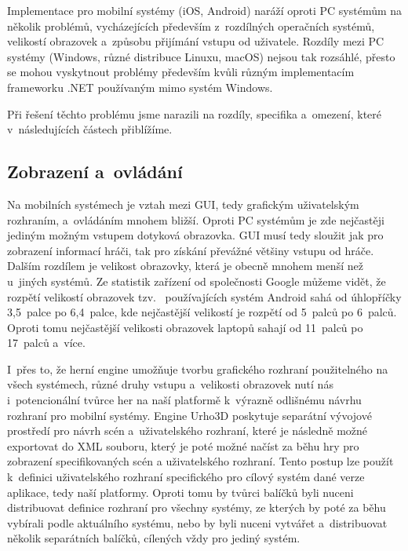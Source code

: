 Implementace pro mobilní systémy (iOS, Android) naráží oproti PC systémům na několik problémů, vycházejících především z~rozdílných operačních systémů, velikostí obrazovek a~způsobu přijímání vstupu od uživatele. Rozdíly mezi PC systémy (Windows, různé distribuce Linuxu, macOS) nejsou tak rozsáhlé, přesto se mohou vyskytnout problémy především kvůli různým implementacím frameworku .NET používaným mimo systém Windows.

Při řešení těchto problému jsme narazili na rozdíly, specifika a~omezení, které v~následujících částech přiblížíme.

\subsection{Zobrazení a~ovládání}
Na mobilních systémech je vztah mezi GUI, tedy grafickým uživatelským rozhraním, a~ovládáním mnohem bližší. Oproti PC systémům je zde nejčastěji jediným možným vstupem dotyková obrazovka. GUI musí tedy sloužit jak pro zobrazení informací hráči, tak pro získání převážné většiny vstupu od hráče. Dalším rozdílem je velikost obrazovky, která je obecně mnohem menší než u~jiných systémů. Ze statistik zařízení od společnosti Google \citep{site:materialdesign} můžeme vidět, že rozpětí velikostí obrazovek tzv.~ používajících systém Android sahá od úhlopříčky 3,5~palce po 6,4~palce, kde nejčastější velikostí je rozpětí od 5~palců po 6~palců. Oproti tomu nejčastější velikosti obrazovek laptopů sahají od 11~palců po 17~palců a~více. 

I~přes to, že herní engine umožňuje tvorbu grafického rozhraní použitelného na všech systémech, různé druhy vstupu a~velikosti obrazovek nutí nás i~potencionální tvůrce her na naší platformě k~výrazně odlišnému návrhu rozhraní pro mobilní systémy. Engine Urho3D poskytuje separátní vývojové prostředí pro návrh scén a~uživatelského rozhraní, které je následně možné exportovat do XML souboru, který je poté možné načíst za běhu hry pro zobrazení specifikovaných scén a uživatelského rozhraní. Tento postup lze použít k~definici uživatelského rozhraní specifického pro cílový systém dané verze aplikace, tedy naší platformy. Oproti tomu by tvůrci balíčků byli nuceni distribuovat definice rozhraní pro všechny systémy, ze kterých by poté za běhu vybírali podle aktuálního systému, nebo by byli nuceni vytvářet a~distribuovat několik separátních balíčků, cílených vždy pro jediný systém. 

